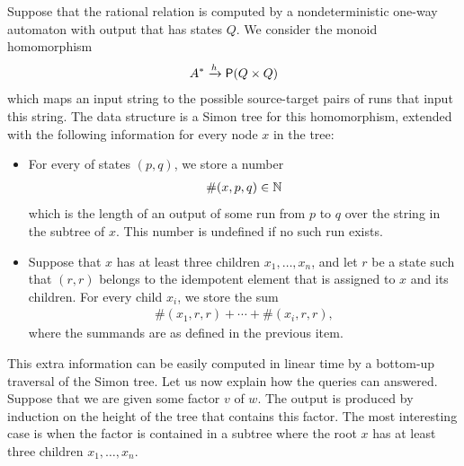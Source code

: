  { 
Suppose that the rational relation is computed by a nondeterministic one-way automaton with output that has states $Q$. We consider the monoid homomorphism
\begin{align*}
A^* \xrightarrow h \mathsf{P}{(Q \times Q)}
\end{align*}
which maps an input string to the possible source-target pairs of runs that input this string. The data structure is a Simon tree for this homomorphism, extended with the following information for every node $x$ in the tree:
\begin{itemize}
    \item For every of states $(p,q)$, we store  a number 
    \begin{align*}
    \#(x,p,q) \in {\mathbb N}
    \end{align*}
    which is the length of  an output of some run from  $p$ to $q$ over the string in the subtree of $x$. This number is undefined if no such run exists. 
    \item Suppose that $x$ has at least three children $x_1,\ldots,x_n$, and let $r$ be a state such that $(r,r)$ belongs to the idempotent element that is assigned to $x$ and its children. For every child $x_i$, we store the sum 
    \begin{align*}
    \#(x_1,r,r) + \cdots + \#(x_i,r,r),
    \end{align*}
    where the summands are as defined in the previous item.    
\end{itemize}
This extra information can be easily computed in linear time by a bottom-up traversal of the Simon tree. Let us now explain how the queries can answered. Suppose that we are given some factor $v$ of $w$.  The output is produced by induction on the height of the tree that contains this factor. The most interesting case is when the factor is contained in a subtree where the root $x$ has at least three children $x_1,\ldots,x_n$.  
}
